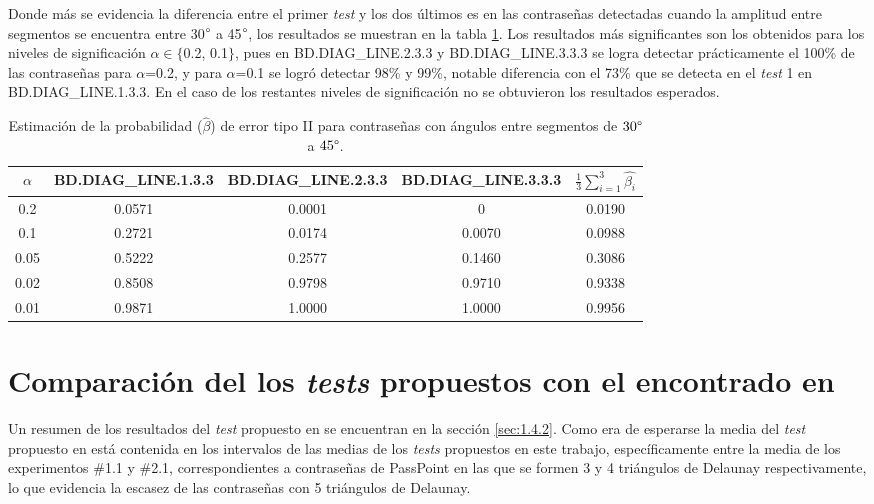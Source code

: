 \documentclass[12pt]{report}
\begin{document}
Donde más se evidencia la diferencia entre  el primer \textit{test} y los dos últimos es en las contraseñas detectadas cuando la amplitud entre segmentos se encuentra entre 30$\degree$ a 45$\degree$, los resultados se muestran en la tabla \ref{tab:error2-30-45}. Los resultados más significantes son los obtenidos para los niveles de significación $\alpha \in \{$0.2, 0.1$\}$, pues en   BD.DIAG\_LINE.2.3.3 y BD.DIAG\_LINE.3.3.3  se logra detectar prácticamente el 100\% de las contraseñas para $\alpha$=0.2, y para $\alpha$=0.1 se logró detectar 98\% y 99\%, notable diferencia con el 73\% que se detecta en el \textit{test} 1 en BD.DIAG\_LINE.1.3.3. En el caso de los restantes niveles de significación no se obtuvieron los resultados esperados.
\begin{table}[h!]
	\centering
	\begin{tabular}{|c|ccc|c|}
		\hline
		$\alpha$& BD.DIAG\_LINE.1.3.3 & BD.DIAG\_LINE.2.3.3 & BD.DIAG\_LINE.3.3.3 &$\frac{1}{3} \sum_{i=1}^{3} \hat{\beta_i}$ \\
		\hline
		0.2 & 0.0571     & 0.0001     & 0        &   0.0190   \\
		0.1 & 0.2721      & 0.0174    & 0.0070    &  0.0988  \\
		0.05& 0.5222    & 0.2577     & 0.1460     &  0.3086  \\
		0.02& 0.8508     & 0.9798    & 0.9710     &   0.9338  \\
		0.01& 0.9871     & 1.0000     & 1.0000   &   0.9956  \\
		\hline
	\end{tabular}
	\caption{Estimación de la probabilidad ($\hat{\beta}$) de error tipo II para contraseñas con ángulos entre segmentos de $30\degree$ a $45\degree$.}
	\label{tab:error2-30-45}
\end{table}


\section{Comparación del los \textit{tests} propuestos con el encontrado en  \cite{13}}
Un resumen de los resultados del \textit{test} propuesto en \cite{13} se encuentran en la sección \ref{sec:1.4.2}. Como era de esperarse la media del \textit{test} propuesto en \cite{13} está contenida en los intervalos de las medias de los \textit{tests} propuestos en este trabajo, específicamente entre la media de los experimentos \#1.1 y \#2.1, correspondientes a contraseñas de PassPoint en las que se formen 3 y 4 triángulos de Delaunay respectivamente, lo que evidencia la escasez de las contraseñas con 5 triángulos de Delaunay.
\end{document}
